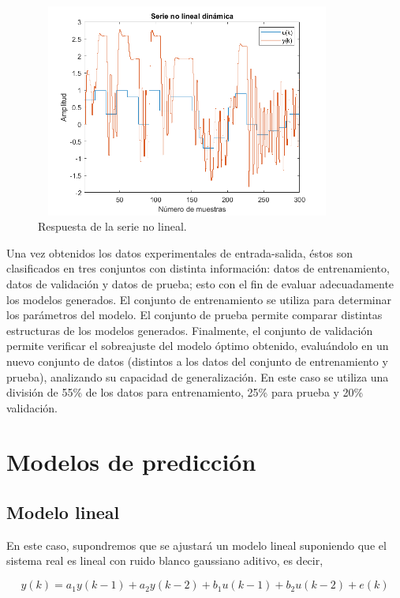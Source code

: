 \documentclass[12pt]{article}
\begin{document}
\begin{figure}
\centering
\includegraphics[width=10cm,height=7cm]{imag/SerieNoLineal}
\caption{Respuesta de la serie no lineal.}
\label{f_SerieNoLineal}
\end{figure}


Una vez obtenidos los datos experimentales de entrada-salida, éstos son clasificados en tres conjuntos con distinta información: datos de entrenamiento, datos
de validación y datos de prueba; esto con el fin de evaluar adecuadamente los modelos
generados. El conjunto de entrenamiento se utiliza para determinar los parámetros del
modelo. El conjunto de prueba permite comparar distintas estructuras de los modelos
generados. Finalmente, el conjunto de validación permite verificar el sobreajuste del
modelo óptimo obtenido, evaluándolo en un nuevo conjunto de datos (distintos a los
datos del conjunto de entrenamiento y prueba), analizando su capacidad de
generalización. En este caso se utiliza una división de 55\% de los datos para entrenamiento, 25\% para prueba y 20\% validación.

\section{Modelos de predicción}
\subsection{Modelo lineal}

En este caso, supondremos que se ajustará un modelo lineal suponiendo que el sistema real es lineal con ruido blanco gaussiano aditivo, es decir,


\begin{equation}
y(k)=a_1 y(k-1)+a_2 y(k-2)+b_1 u(k-1)+b_2 u(k-2)+e(k)
\label{e_ModeloLineal}
\end{equation}
\end{document}
